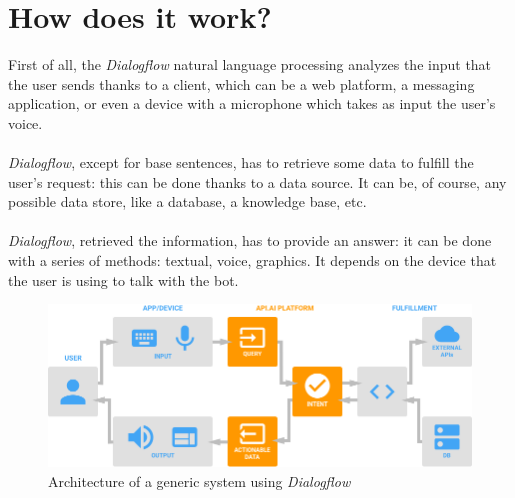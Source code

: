 \documentclass[a4paper,12pt]{report}
\begin{document}
	\section{How does it work?}
	First of all, the \textit{Dialogflow} natural language processing analyzes the input that the user sends thanks to a client, which can be a web platform, a messaging application, or even a device with a microphone which takes as input the user's voice.\\\\
	\textit{Dialogflow}, except for base sentences, has to retrieve some data to fulfill the user's request: this can be done thanks to a data source. It can be, of course, any possible data store, like a database, a knowledge base, etc.\\\\
	\textit{Dialogflow}, retrieved the information, has to provide an answer: it can be done with a series of methods: textual, voice, graphics. It depends on the device that the user is using to talk with the bot.
	
	\begin{figure}[H]
		\centering
		\includegraphics[scale=0.4]{apiai}
		\caption{Architecture of a generic system using \textit{Dialogflow}\cite{apiai}}
	\end{figure}
	
\end{document}
